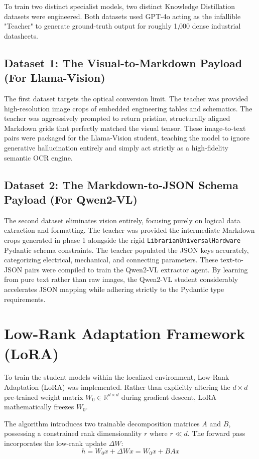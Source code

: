 To train two distinct specialist models, two distinct Knowledge Distillation datasets were engineered. Both datasets used GPT-4o acting as the infallible "Teacher" to generate ground-truth output for roughly 1,000 dense industrial datasheets.

\subsection{Dataset 1: The Visual-to-Markdown Payload (For Llama-Vision)}
The first dataset targets the optical conversion limit. The teacher was provided high-resolution image crops of embedded engineering tables and schematics. The teacher was aggressively prompted to return pristine, structurally aligned Markdown grids that perfectly matched the visual tensor.
These image-to-text pairs were packaged for the Llama-Vision student, teaching the model to ignore generative hallucination entirely and simply act strictly as a high-fidelity semantic OCR engine.

\subsection{Dataset 2: The Markdown-to-JSON Schema Payload (For Qwen2-VL)}
The second dataset eliminates vision entirely, focusing purely on logical data extraction and formatting. The teacher was provided the intermediate Markdown crops generated in phase 1 alongside the rigid \texttt{LibrarianUniversalHardware} Pydantic schema constraints. The teacher populated the JSON keys accurately, categorizing electrical, mechanical, and connecting parameters.
These text-to-JSON pairs were compiled to train the Qwen2-VL extractor agent. By learning from pure text rather than raw images, the Qwen2-VL student considerably accelerates JSON mapping while adhering strictly to the Pydantic type requirements.

\section{Low-Rank Adaptation Framework (LoRA)}
\label{sec:lora_math}

To train the student models within the localized environment, Low-Rank Adaptation (LoRA) was implemented. Rather than explicitly altering the $d \times d$ pre-trained weight matrix $W_0 \in \mathbb{R}^{d \times d}$ during gradient descent, LoRA mathematically freezes $W_0$. 

The algorithm introduces two trainable decomposition matrices $A$ and $B$, possessing a constrained rank dimensionality $r$ where $r \ll d$. The forward pass incorporates the low-rank update $\Delta W$:
\begin{equation}
h = W_0 x + \Delta W x = W_0 x + BA x
\end{equation}

